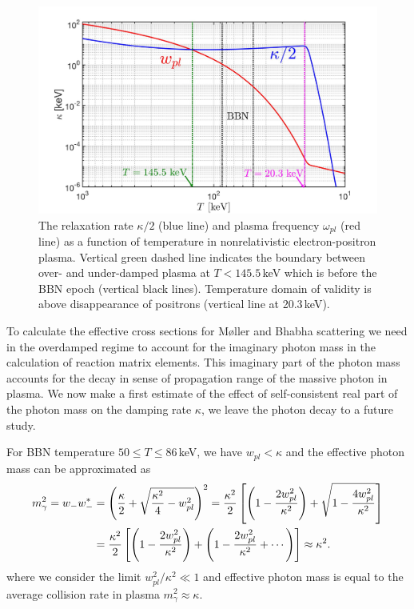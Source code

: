 \begin{figure}  
\centerline{\includegraphics[width=0.9\linewidth]{./plots/KappaElectronPhotonMass_Talk}}
\caption{The relaxation rate $\kappa/2$ (blue line) and plasma frequency $\omega_{pl}$ (red line) as a function of temperature in nonrelativistic electron-positron plasma. Vertical green dashed line indicates the boundary between over- and under-damped plasma at  $T<145.5$\,keV  which is before the BBN epoch (vertical black lines). Temperature domain of validity is above disappearance of positrons (vertical line at 20.3\,keV). }
\label{RelaxationRate002:fig} 
\end{figure}

To calculate the effective cross sections for  M{\o}ller and Bhabha scattering we need in the overdamped regime to account for the imaginary photon mass in the calculation of reaction matrix elements. This imaginary part of the photon mass accounts for the decay in sense  of propagation range of the massive photon in plasma. We now make a first estimate of the effect of self-consistent real part of the photon mass on the damping rate $\kappa$, we leave the photon decay to a future study.

For BBN temperature $50\leqslant T\leqslant 86$\,keV,
we have $w_{pl}<\kappa$ and the effective photon mass can be approximated as
\begin{align}
m^2_\gamma=w_-w_-^\ast&=\left(\frac{\kappa}{2}+\sqrt{\frac{\kappa^2}{4}-w^2_{pl}}\right)^2
=\frac{\kappa^2}{2}\left[\left(1-\frac{2w^2_{pl}}{\kappa^2}\right)+\sqrt{1-\frac{4w^2_{pl}}{\kappa^2}}\right]\notag\\
&=\frac{\kappa^2}{2}\left[\left(1-\frac{2w^2_{pl}}{\kappa^2}\right)+\left(1-\frac{2w^2_{pl}}{\kappa^2}+\cdots\right)\right]\approx\kappa^2.
\label{PhotonMassPlasma002}
\end{align}
where we consider the limit $w^2_{pl}/\kappa^2\ll 1$ and effective photon mass is equal to the average collision rate in plasma $m^2_\gamma\approx\kappa$.


